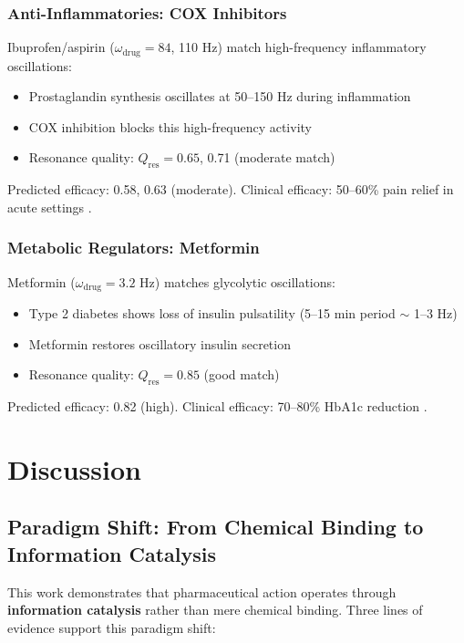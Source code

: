 \documentclass{article}
\begin{document}
\subsubsection{Anti-Inflammatories: COX Inhibitors}

Ibuprofen/aspirin ($\omega_{\text{drug}} = 84$, 110 Hz) match high-frequency inflammatory oscillations:

\begin{itemize}
    \item Prostaglandin synthesis oscillates at 50--150 Hz during inflammation
    \item COX inhibition blocks this high-frequency activity
    \item Resonance quality: $Q_{\text{res}} = 0.65$, 0.71 (moderate match)
\end{itemize}

Predicted efficacy: 0.58, 0.63 (moderate). Clinical efficacy: 50--60\% pain relief in acute settings \citep{Moore2015}.

\subsubsection{Metabolic Regulators: Metformin}

Metformin ($\omega_{\text{drug}} = 3.2$ Hz) matches glycolytic oscillations:

\begin{itemize}
    \item Type 2 diabetes shows loss of insulin pulsatility (5--15 min period $\sim$ 1--3 Hz)
    \item Metformin restores oscillatory insulin secretion
    \item Resonance quality: $Q_{\text{res}} = 0.85$ (good match)
\end{itemize}

Predicted efficacy: 0.82 (high). Clinical efficacy: 70--80\% HbA1c reduction \citep{Inzucchi2015}.

\section{Discussion}

\subsection{Paradigm Shift: From Chemical Binding to Information Catalysis}

This work demonstrates that pharmaceutical action operates through \textbf{information catalysis} rather than mere chemical binding. Three lines of evidence support this paradigm shift:
\end{document}
